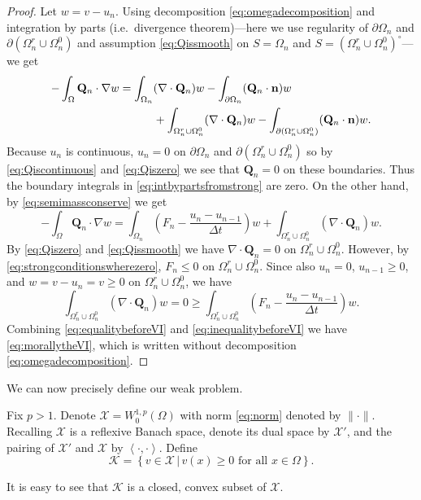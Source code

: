 \documentclass[final,leqno,onefignum,onetabnum]{siamltex1213bueler}
\newcommand\bn{\mathbf{n}}
\newcommand\bQ{\mathbf{Q}}
\newcommand{\Div}{\nabla\cdot}
\renewcommand{\grad}{\nabla}
\newcommand{\ip}[2]{\ensuremath{\left<#1,#2\right>}}
\begin{document}
\begin{proof}  Let $w=v-u_n$.  Using decomposition \eqref{eq:omegadecomposition} and integration by parts (i.e.~divergence theorem)---here we use regularity of $\partial \Omega_n$ and $\partial(\Omega_n^r \cup \Omega_n^0)$ and assumption \eqref{eq:Qissmooth} on $S=\Omega_n$ and $S=(\Omega_n^r \cup \Omega_n^0)^\circ$---we get
\begin{align}
-\int_{\Omega} \bQ_n \cdot \grad w &= \int_{\Omega_n} (\Div \bQ_n) w - \int_{\partial \Omega_n} (\bQ_n \cdot \bn) w \label{eq:intbypartsfromstrong} \\
  &\qquad\quad + \int_{\Omega_n^r \cup \Omega_n^0} (\Div \bQ_n) w - \int_{\partial(\Omega_n^r \cup \Omega_n^0)} (\bQ_n \cdot \bn) w. \notag
\end{align}
Because $u_n$ is continuous, $u_n=0$ on $\partial \Omega_n$ and $\partial(\Omega_n^r \cup \Omega_n^0)$ so by \eqref{eq:Qiscontinuous} and \eqref{eq:Qiszero} we see that $\bQ_n=0$ on these boundaries.  Thus the boundary integrals in \eqref{eq:intbypartsfromstrong} are zero.  On the other hand, by \eqref{eq:semimassconserve} we get
\begin{equation}
-\int_{\Omega} \bQ_n \cdot \grad w = \int_{\Omega_n} \left(F_n - \frac{u_n - u_{n-1}}{\Delta t}\right) w + \int_{\Omega_n^r \cup \Omega_n^0} (\Div \bQ_n) w. \label{eq:equalitybeforeVI}
\end{equation}
By \eqref{eq:Qiszero} and \eqref{eq:Qissmooth} we have $\Div \bQ_n=0$ on $\Omega_n^r \cup \Omega_n^0$.  However, by \eqref{eq:strongconditionswherezero}, $F_n \le 0$ on $\Omega_n^r \cup \Omega_n^0$.  Since also $u_n=0$, $u_{n-1}\ge 0$, and $w = v-u_n = v \ge 0$ on $\Omega_n^r \cup \Omega_n^0$, we have
\begin{equation}
    \int_{\Omega_n^r \cup \Omega_n^0} (\Div \bQ_n) w = 0 \ge \int_{\Omega_n^r \cup \Omega_n^0} \left(F_n - \frac{u_n - u_{n-1}}{\Delta t}\right) w. \label{eq:inequalitybeforeVI}
\end{equation}
Combining \eqref{eq:equalitybeforeVI} and \eqref{eq:inequalitybeforeVI} we have \eqref{eq:morallytheVI}, which is written without decomposition \eqref{eq:omegadecomposition}.
\end{proof}

\medskip
We can now precisely define our weak problem.

\medskip
\begin{definition}  \label{def:spaces}  Fix $p>1$.  Denote $\mathcal{X} = W_0^{1,p}(\Omega)$ with norm \eqref{eq:norm} denoted by $\|\cdot\|$.  Recalling $\mathcal{X}$ is a reflexive Banach space, denote its dual space by $\mathcal{X}'$, and the pairing of $\mathcal{X}'$ and $\mathcal{X}$ by $\ip{\cdot}{\cdot}$.  Define
    $$\mathcal{K} = \left\{v \in \mathcal{X} \,\big|\, v(x) \ge 0 \text{ for all } x \in \Omega\right\}.$$
\end{definition}
It is easy to see that $\mathcal{K}$ is a closed, convex subset of $\mathcal{X}$.  
\end{document}

